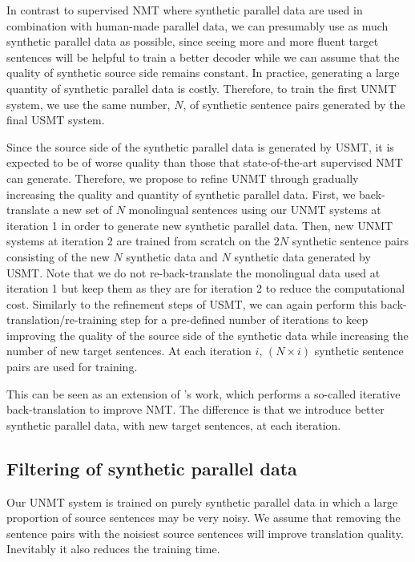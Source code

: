 \documentclass[11pt,a4paper]{article}
\begin{document}
In contrast to supervised NMT where synthetic parallel data are used in combination with human-made parallel data, we can presumably use as much synthetic parallel data as possible, since seeing more and more fluent target sentences will be helpful to train a better decoder while we can assume that the quality of synthetic source side remains constant. In practice, generating a large quantity of synthetic parallel data is costly. Therefore, to train the first UNMT system, we use the same number, $N$, of synthetic sentence pairs generated by the final USMT system.

Since the source side of the synthetic parallel data is generated by USMT, it is expected to be of worse quality than those that state-of-the-art supervised NMT can generate. Therefore, we propose to refine UNMT through gradually increasing the quality and quantity of synthetic parallel data. First, we back-translate a new set of $N$ monolingual sentences using our UNMT systems at iteration 1 in order to generate new synthetic parallel data. Then, new UNMT systems at iteration 2 are trained from scratch on the $2N$ synthetic sentence pairs consisting of the new $N$ synthetic data and $N$ synthetic data generated by USMT. Note that we do not re-back-translate the monolingual data used at iteration 1 but keep them as they are for iteration 2 to reduce the computational cost. Similarly to the refinement steps of USMT, we can again perform this back-translation/re-training step for a pre-defined number of iterations to keep improving the quality of the source side of the synthetic data while increasing the number of new target sentences. At each iteration $i$, $(N\times i)$ synthetic sentence pairs are used for training.

This can be seen as an extension of \citet{hoang-EtAl:2018:WNMT20181}'s work, which performs a so-called iterative back-translation to improve NMT. The difference is that we introduce better synthetic parallel data, with new target sentences, at each iteration.

\subsection{Filtering of synthetic parallel data}
\label{section:filternmt}
Our UNMT system is trained on purely synthetic parallel data in which a large proportion of source sentences may be very noisy. We assume that removing the sentence pairs with the noisiest source sentences will improve translation quality.  Inevitably it also reduces the training time.
\end{document}
